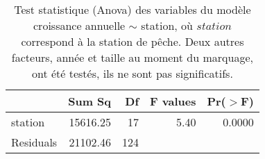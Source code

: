 \begin{table}[ht]
\centering
\begin{tabular}{lrrrr}
  \hline
 & Sum Sq & Df & F values & Pr($>$F) \\ 
  \hline
station & 15616.25 & 17 & 5.40 & 0.0000 \\ 
  Residuals & 21102.46 & 124 &  &  \\ 
   \hline
\end{tabular}
\caption{Test statistique (Anova) des variables du modèle croissance annuelle $\sim$ station,
						où $station$ correspond à la station de pêche. Deux autres facteurs, année et taille au moment du marquage,
						ont été testés, ils ne sont pas significatifs.} 
\label{table_anova_marquage}
\end{table}
